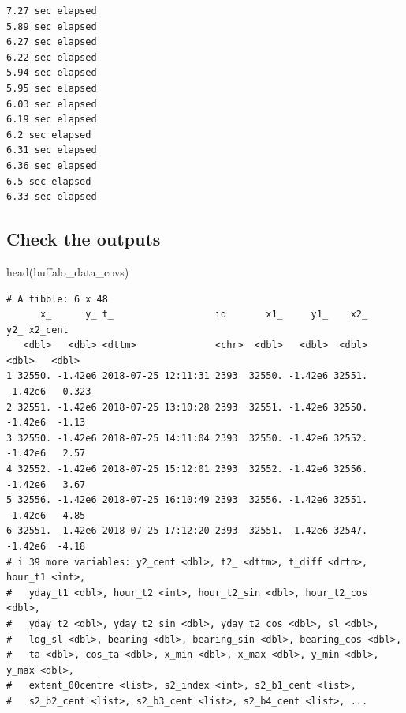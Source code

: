 \documentclass[
  letterpaper,
  DIV=11,
  numbers=noendperiod]{scrartcl}
\newenvironment{Shaded}{\begin{snugshade}}{\end{snugshade}}
\newcommand{\AttributeTok}[1]{\textcolor[rgb]{0.40,0.45,0.13}{#1}}
\newcommand{\FunctionTok}[1]{\textcolor[rgb]{0.28,0.35,0.67}{#1}}
\newcommand{\NormalTok}[1]{\textcolor[rgb]{0.00,0.23,0.31}{#1}}
\newcommand{\SpecialCharTok}[1]{\textcolor[rgb]{0.37,0.37,0.37}{#1}}
\newcommand{\StringTok}[1]{\textcolor[rgb]{0.13,0.47,0.30}{#1}}
\begin{document}
\begin{Shaded}
\end{Shaded}

\begin{verbatim}
7.27 sec elapsed
5.89 sec elapsed
6.27 sec elapsed
6.22 sec elapsed
5.94 sec elapsed
5.95 sec elapsed
6.03 sec elapsed
6.19 sec elapsed
6.2 sec elapsed
6.31 sec elapsed
6.36 sec elapsed
6.5 sec elapsed
6.33 sec elapsed
\end{verbatim}

\subsection{Check the outputs}\label{check-the-outputs}

\begin{Shaded}
\begin{Highlighting}[]
\FunctionTok{head}\NormalTok{(buffalo\_data\_covs)}
\end{Highlighting}
\end{Shaded}

\begin{verbatim}
# A tibble: 6 x 48
      x_      y_ t_                  id       x1_     y1_    x2_     y2_ x2_cent
   <dbl>   <dbl> <dttm>              <chr>  <dbl>   <dbl>  <dbl>   <dbl>   <dbl>
1 32550. -1.42e6 2018-07-25 12:11:31 2393  32550. -1.42e6 32551. -1.42e6   0.323
2 32551. -1.42e6 2018-07-25 13:10:28 2393  32551. -1.42e6 32550. -1.42e6  -1.13 
3 32550. -1.42e6 2018-07-25 14:11:04 2393  32550. -1.42e6 32552. -1.42e6   2.57 
4 32552. -1.42e6 2018-07-25 15:12:01 2393  32552. -1.42e6 32556. -1.42e6   3.67 
5 32556. -1.42e6 2018-07-25 16:10:49 2393  32556. -1.42e6 32551. -1.42e6  -4.85 
6 32551. -1.42e6 2018-07-25 17:12:20 2393  32551. -1.42e6 32547. -1.42e6  -4.18 
# i 39 more variables: y2_cent <dbl>, t2_ <dttm>, t_diff <drtn>, hour_t1 <int>,
#   yday_t1 <dbl>, hour_t2 <int>, hour_t2_sin <dbl>, hour_t2_cos <dbl>,
#   yday_t2 <dbl>, yday_t2_sin <dbl>, yday_t2_cos <dbl>, sl <dbl>,
#   log_sl <dbl>, bearing <dbl>, bearing_sin <dbl>, bearing_cos <dbl>,
#   ta <dbl>, cos_ta <dbl>, x_min <dbl>, x_max <dbl>, y_min <dbl>, y_max <dbl>,
#   extent_00centre <list>, s2_index <int>, s2_b1_cent <list>,
#   s2_b2_cent <list>, s2_b3_cent <list>, s2_b4_cent <list>, ...
\end{verbatim}
\end{document}
